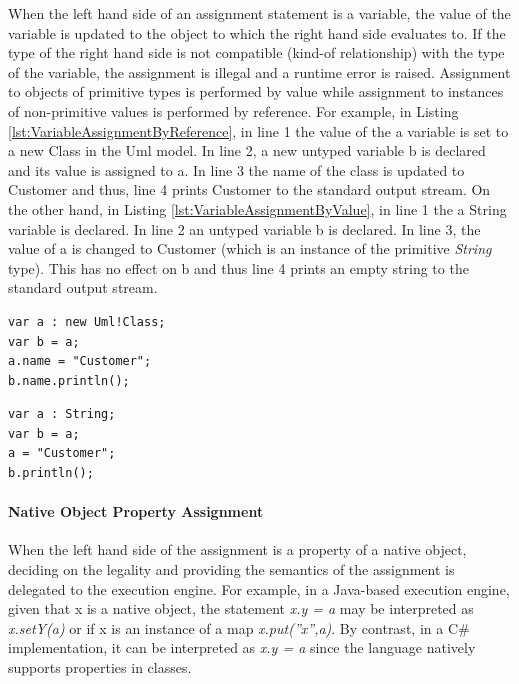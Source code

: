 When the left hand side of an assignment statement is a variable, the value of the variable is updated to the object to which the right hand side evaluates to. If the type of the right hand side is not compatible (kind-of relationship) with the type of the variable, the assignment is illegal and a runtime error is raised. Assignment to objects of primitive types is performed by value while assignment to instances of non-primitive values is performed by reference. For example, in Listing \ref{lst:VariableAssignmentByReference}, in line 1 the value
of the a variable is set to a new Class in the Uml model. In line 2, a new untyped variable b is declared and its value is assigned to a. In line 3 the name of the class is updated to Customer and thus, line 4 prints Customer to the standard output stream. On the other hand, in Listing \ref{lst:VariableAssignmentByValue}, in line 1 the a String variable is declared. In line 2 an untyped variable b is declared. In line 3, the value of a is changed to Customer (which is an instance of the primitive \emph{String} type). This has no effect on b and thus line 4 prints an empty string to the standard output stream.

\begin{lstlisting}[basicstyle=\ttfamily\footnotesize, flexiblecolumns=true, numbers=none, nolol=true, caption=Assigning the value of a variable by reference, label=lst:VariableAssignmentByReference, numbers=left, language=EOL, tabsize=2]
var a : new Uml!Class;
var b = a;
a.name = "Customer";
b.name.println();
\end{lstlisting}

\begin{lstlisting}[basicstyle=\ttfamily\footnotesize, flexiblecolumns=true, numbers=none, nolol=true, caption=Assigning the value of a variable by value, label=lst:VariableAssignmentByValue, numbers=left, language=EOL, tabsize=2]
var a : String;
var b = a;
a = "Customer";
b.println();
\end{lstlisting}

\paragraph{Native Object Property Assignment}

When the left hand side of the assignment is a property of a native object, deciding on the legality and providing the semantics of the assignment is delegated to the execution engine. For example, in a Java-based execution engine, given that x is a native object, the statement \emph{x.y = a} may be interpreted as \emph{x.setY(a)} or if x is an instance of a map \emph{x.put(''x'',a)}. By contrast, in a C\# implementation, it can be interpreted as \emph{x.y = a} since
the language natively supports properties in classes.

